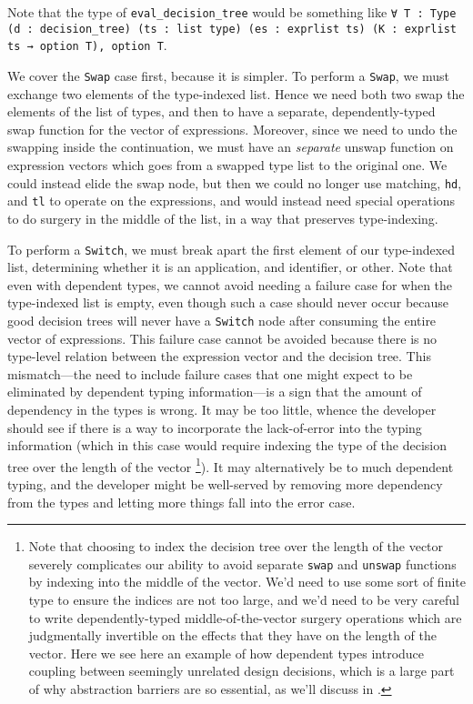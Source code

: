 Note that the type of \texttt{eval_decision_tree} would be something like \texttt{∀ {T : Type} (d : decision_tree) (ts : list type) (es : exprlist ts) (K : exprlist ts → option T), option T}.


We cover the \texttt{Swap} case first, because it is simpler.
To perform a \texttt{Swap}, we must exchange two elements of the type-indexed list.
Hence we need both two swap the elements of the list of types, and then to have a separate, dependently-typed swap function for the vector of expressions.
Moreover, since we need to undo the swapping inside the continuation, we must have an \emph{separate} unswap function on expression vectors which goes from a swapped type list to the original one.
We could instead elide the swap node, but then we could no longer use matching, \texttt{hd}, and \texttt{tl} to operate on the expressions, and would instead need special operations to do surgery in the middle of the list, in a way that preserves type-indexing.

To perform a \texttt{Switch}, we must break apart the first element of our type-indexed list, determining whether it is an application, and identifier, or other.
Note that even with dependent types, we cannot avoid needing a failure case for when the type-indexed list is empty, even though such a case should never occur because good decision trees will never have a \texttt{Switch} node after consuming the entire vector of expressions.
This failure case cannot be avoided because there is no type-level relation between the expression vector and the decision tree.
This mismatch---the need to include failure cases that one might expect to be eliminated by dependent typing information---is a sign that the amount of dependency in the types is wrong.
It may be too little, whence the developer should see if there is a way to incorporate the lack-of-error into the typing information (which in this case would require indexing the type of the decision tree over the length of the vector%
\label{sec:break-abstraction:example:decision-tree-indexing}%
\footnote{\label{foot:break-abstraction:example:decision-tree-indexing}%
  Note that choosing to index the decision tree over the length of the vector severely complicates our ability to avoid separate \texttt{swap} and \texttt{unswap} functions by indexing into the middle of the vector.
  We'd need to use some sort of finite type to ensure the indices are not too large, and we'd need to be very careful to write dependently-typed middle-of-the-vector surgery operations which are judgmentally invertible on the effects that they have on the length of the vector.
  Here we see here an example of how dependent types introduce coupling between seemingly unrelated design decisions, which is a large part of why abstraction barriers are so essential, as we'll discuss in .
}).
It may alternatively be to much dependent typing, and the developer might be well-served by removing more dependency from the types and letting more things fall into the error case.

